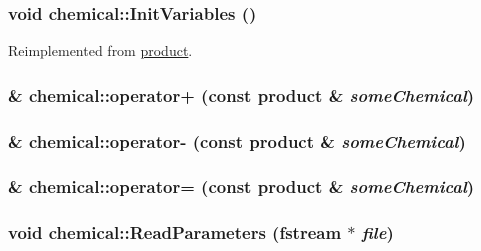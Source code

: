 \label{classchemical_ae66c160476435100ad1596cf55553073}
\hypertarget{classchemical_a8bb531b70e8d9c2270b2f9464d22069a}{
\subsubsection[{InitVariables}]{\setlength{\rightskip}{0pt plus 5cm}void chemical::InitVariables ()}}
\label{classchemical_a8bb531b70e8d9c2270b2f9464d22069a}


Reimplemented from \hyperlink{classproduct_afcbfb1feadfd4ed057845eab47e37ff5}{product}.\hypertarget{classchemical_afd86e5c4798e2eb77e9705a36aa3f5f9}{
\subsubsection[{operator+}]{ \& chemical::operator+ (const {\bf product} \& {\em someChemical})}}
\label{classchemical_afd86e5c4798e2eb77e9705a36aa3f5f9}
\hypertarget{classchemical_a1ec6784955496e6b0b9199c20bbeb12b}{
\subsubsection[{operator-\/}]{ \& chemical::operator-\/ (const {\bf product} \& {\em someChemical})}}
\label{classchemical_a1ec6784955496e6b0b9199c20bbeb12b}
\hypertarget{classchemical_a2fb689080661790a2900f7000425e848}{
\subsubsection[{operator=}]{ \& chemical::operator= (const {\bf product} \& {\em someChemical})}}
\label{classchemical_a2fb689080661790a2900f7000425e848}
\hypertarget{classchemical_acfdd25cd02bb7b5cd41e2daf5e890f7d}{
\subsubsection[{ReadParameters}]{\setlength{\rightskip}{0pt plus 5cm}void chemical::ReadParameters (fstream $\ast$ {\em file})}}
\label{classchemical_acfdd25cd02bb7b5cd41e2daf5e890f7d}



